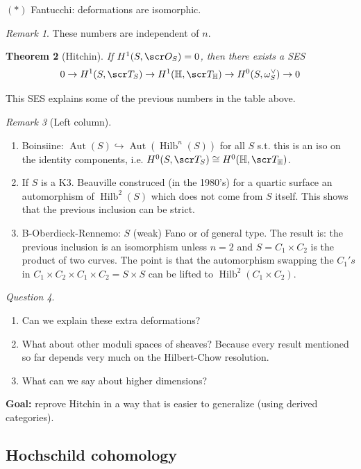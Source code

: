 \documentclass[A4paper, british]{amsart}
\theoremstyle{darkgreentheorem}
\newtheorem{thm}{Theorem}[section]
\theoremstyle{darkbluedefinition}
\theoremstyle{darkredexample}
\theoremstyle{remark}
\newtheorem{rem}[thm]{Remark}
\newtheorem{q}[thm]{Question}
\DeclareMathOperator{\Hilb}{Hilb}
\DeclareMathOperator{\Aut}{Aut}
\newcommand{\1}{\mathbbm{1}}
\newcommand{\dual}{^{\vee}}
\newcommand{\tms}{\times}
\newcommand{\mono}{\hookrightarrow}
\begin{document}
$(*)$ Fantucchi: deformations are isomorphic.

\begin{rem}
    These numbers are independent of $n$.
\end{rem}

\begin{thm}[Hitchin]
    If $H^{1}(S,\O_{S})=0$, then there exists a SES
    \[ 0\to H^{1}(S,\sT_{S})\to H^{1}(\bbH,\sT_{\bbH})\to H^{0}(S,\w_{S}\dual)\to 0 \]
\end{thm}
This SES explains some of the previous numbers in the table above.

\begin{rem}[Left column]
    \begin{enumerate}
	\item Boinsiine: $\Aut(S)\mono \Aut(\Hilb^{n}(S))$ for all $S$ s.t. this is an iso on the identity components, i.e. $H^{0}(S,\sT_{S})\cong H^{0}(\bbH,\sT_{\bbH})$.
	\item If $S$ is a K3.
	    Beauville construced (in the 1980's) for a quartic surface an automorphism of $\Hilb^{2}(S)$ which does not come from $S$ itself.
	    This shows that the previous inclusion can be strict.
	\item B-Oberdieck-Rennemo: $S$ (weak) Fano or of general type.
	    The result is: the previous inclusion is an isomorphism unless $n=2$ and $S=C_{1}\tms C_{2}$ is the product of two curves.
	    The point is that the automorphism swapping the $C_{1}'s$ in $C_{1}\times C_{2}\times C_{1}\times C_{2}=S\times S$ can be lifted to $\Hilb^{2}(C_{1}\times C_{2})$.
    \end{enumerate}
\end{rem}

\begin{q}
    \begin{enumerate}
	\item Can we explain these extra deformations?
	\item What about other moduli spaces of sheaves? Because every result mentioned so far depends very much on the Hilbert-Chow resolution.
	\item What can we say about higher dimensions?
    \end{enumerate}
\end{q}

\textbf{Goal:} reprove Hitchin in a way that is easier to generalize (using derived categories).

\subsection{Hochschild cohomology}
\end{document}
